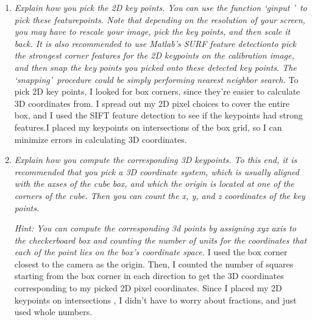 \documentclass[11pt]{article}
\begin{document}
    \begin{enumerate}
        \item \textit{Explain how you pick the 2D key points. You can use the function \textquoteleft ginput
        \textquoteright\ to pick these featurepoints. Note that depending on the resolution of your screen, you may
        have to rescale your image, pick the key points, and then scale it back. It is also recommended to use Matlab’s
        SURF feature detectionto pick the strongest corner features for the 2D keypoints on the calibration image, and
        then snap the key points you picked onto these detected key points. The \textquoteleft snapping\textquoteright\
            procedure could be simply performing nearest neighbor search.}\newline
        To pick 2D key points, I looked for box corners, since they're easier to calculate 3D coordinates from. I
        spread out my 2D pixel choices to cover the entire box, and I used the SIFT feature detection to see if the
        keypoints had strong features.I placed my keypoints on intersections of the box grid, so I can minimize
        errors in calculating 3D coordinates.\newline
        \noindent{}\newline

        \item \textit{Explain how you compute the corresponding 3D keypoints. To this end, it is recommended that you
        pick a 3D coordinate system, which is usually aligned with the axses of the cube box, and which the origin is
        located at one of the corners of the cube. Then you can count the x, y, and z coordinates of the key points.}
        \par
        \textit{Hint: You can compute the corresponding 3d points by assigning xyz axis to the checkerboard box and
        counting the number of units for the coordinates that each of the point lies on the box’s coordinate space.}\newline
        I used the box corner closest to the camera as the origin.\newline
        Then, I counted the number of squares starting from the box corner in each direction to get the 3D
        coordinates corresponding to my picked 2D pixel coordinates. Since I placed my 2D keypoints on intersections
        , I didn't have to worry about fractions, and just used whole numbers.\newline


\end{enumerate}
\end{document}
